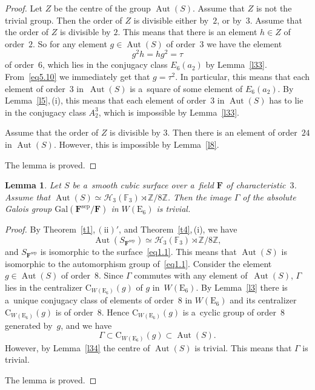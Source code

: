 \documentclass{amsart}
\numberwithin{equation}{section}
\theoremstyle{plain}
\newtheorem{lemma}{Lemma}
\theoremstyle{definition}
\theoremstyle{remark}
\begin{document}
\begin{proof}
Let $Z$ be the centre of the group $\operatorname{Aut}(S)$. Assume that $Z$ is not the trivial group. Then the order of $Z$ is divisible either by~$2$, or by~$3$. Assume that the order of $Z$ is divisible by $2$. This means that there is an element $h \in Z$ of order~$2$. So for any element $g \in \operatorname{Aut}(S)$ of order~$3$ we have the element
\begin{equation}
\label{eq5.10}
g^2h=hg^2=\tau
\end{equation}
of order~$6$, which lies in the conjugacy class $E_6(a_2)$ by Lemma~\ref{l33}. From~\eqref{eq5.10} we immediately get that $g=\tau^2$. In particular, this means that each element of order~$3$ in~$\operatorname{Aut}(S)$ is a~square of some element of $E_6(a_2)$. By Lemma~\ref{l5},\,(i), this means that each element of order~$3$ in $\operatorname{Aut}(S)$ has to lie in the conjugacy class $A_2^3$, which is impossible by Lemma~\ref{l33}.

Assume that the order of $Z$ is divisible by $3$. Then there is an element of order~$24$ in $\operatorname{Aut}(S)$. However, this is impossible by Lemma~\ref{l8}.

The lemma is proved.
\end{proof}

\begin{lemma}
\label{l35}
Let $S$ be a~smooth cubic surface over a~field $\mathbf{F}$ of characteristic~$3$. Assume that $\operatorname{Aut}(S) \simeq \mathcal{H}_3(\mathbb{F}_3) \rtimes \mathbb{Z}/8\mathbb{Z}$. Then the image $\Gamma$ of the absolute Galois group $\mathrm{Gal}(\mathbf{F}^{\mathrm{sep}}/\mathbf{F})$ in $W(\mathrm{E}_6)$ is trivial.
\end{lemma}

\begin{proof}
By Theorem~\ref{t1},\,$(\mathrm{ii})'$, and Theorem~\ref{t4},\,(i), we have
$$
\operatorname{Aut}(S_{\mathbf{F}^{\mathrm{sep}}}) \simeq \mathcal{H}_3(\mathbb{F}_3) \rtimes \mathbb{Z}/8\mathbb{Z},
$$
and $S_{\mathbf{F}^{\mathrm{sep}}}$ is isomorphic to the surface~\eqref{eq1.1}. This means that $\operatorname{Aut}(S)$ is isomorphic to the automorphism group of~\eqref{eq1.1}. Consider the element $g \in \operatorname{Aut}(S)$ of order~$8$. Since $\Gamma$ commutes with any element of~$\operatorname{Aut}(S)$, $\Gamma$ lies in the centralizer $\mathrm{C}_{W(\mathrm{E}_6)}(g)$ of $g$ in~$W(\mathrm{E}_6)$. By Lemma~\ref{l3} there is a~unique conjugacy class of elements of order~$8$ in $W(\mathrm{E}_6)$ and its centralizer~$\mathrm{C}_{W(\mathrm{E}_6)}(g)$ is of order~$8$. Hence $\mathrm{C}_{W(\mathrm{E}_6)}(g)$ is a~cyclic group of order~$8$ generated by~$g$, and we have
$$
\Gamma \subset \mathrm{C}_{W(\mathrm{E}_6)}(g) \subset \operatorname{Aut}(S).
$$
However, by Lemma~\ref{l34} the centre of $\operatorname{Aut}(S)$ is trivial. This means that $\Gamma$ is trivial.

The lemma is proved.
\end{proof}
\end{document}
